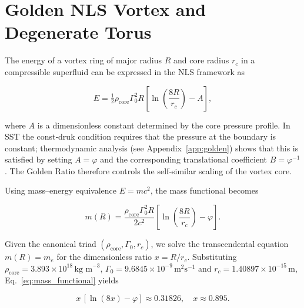 \documentclass[11pt]{article}
\newcommand{\rc}{r_c}                                    %
\newcommand{\rhocore}{\rho_{\text{core}}}
\newcommand{\GammaSST}{\Gamma_0}
\newcommand{\phiG}{\varphi}
\begin{document}


\section{Golden NLS Vortex and Degenerate Torus}


\label{sec:NLS}


The energy of a vortex ring of major radius $R$ and core radius $\rc$ in a compressible superfluid can be expressed in the NLS framework as


\begin{equation}


    E = \tfrac{1}{2} \rhocore \GammaSST^2 R \left[ \ln \left( \frac{8R}{\rc} \right) - A \right],


    \label{eq:NLS_energy}


\end{equation}


where $A$ is a dimensionless constant determined by the core pressure profile.  In SST the const‑druk condition requires that the pressure at the boundary is constant; thermodynamic analysis (see Appendix~\ref{app:golden}) shows that this is satisfied by setting $A=\phiG$ and the corresponding translational coefficient $B=\phiG^{-1}$.  The Golden Ratio therefore controls the self‑similar scaling of the vortex core.






Using mass–energy equivalence $E = m c^2$, the mass functional becomes


\begin{equation}


    m(R) = \frac{\rhocore \GammaSST^2 R}{2 c^2} \left[ \ln \left( \frac{8R}{\rc} \right) - \phiG \right].


    \label{eq:mass_functional}


\end{equation}


Given the canonical triad $(\rhocore,\GammaSST,\rc)$, we solve the transcendental equation $m(R)=m_e$ for the dimensionless ratio $x=R/\rc$.  Substituting $\rhocore = 3.893\times 10^{18}\,\text{kg m}^{-3}$, $\GammaSST = 9.6845\times 10^{-9}\,\text{m}^2\text{s}^{-1}$ and $\rc = 1.40897\times 10^{-15}\,\text{m}$, Eq.~\eqref{eq:mass_functional} yields


\begin{equation}


    x\,[\ln(8x) - \phiG] \approx 0.31826,\quad x \approx 0.895.


\end{equation}
\end{document}

